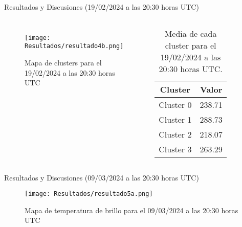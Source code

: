 \documentclass[aspectratio=169,xcolor=dvipsnames]{beamer}
\begin{document}
\begin{frame}{Resultados y Discusiones (19/02/2024 a las 20:30 horas UTC)}
    \begin{columns}

        \begin{figure}
            \centering
            \texttt{[image: Resultados/resultado4b.png]}
            {\footnotesize %
            \caption{Mapa de clusters para el 19/02/2024 a las 20:30 horas UTC}
            \label{fig15}
            }
        \end{figure}

        \centering
        \begin{table}[h!]
            \centering
            {\footnotesize %
            \begin{tabular}{|c|c|}
                \hline
                \textbf{Cluster} & \textbf{Valor} \\
                \hline
                Cluster 0 & 238.71 \\
                Cluster 1 & 288.73 \\
                Cluster 2 & 218.07 \\
                Cluster 3 & 263.29 \\                
                \hline
            \end{tabular}
            \caption{Media de cada cluster para el 19/02/2024 a las 20:30 horas UTC.}
            }
        \end{table}

    \end{columns}
\end{frame}
\begin{frame}{Resultados y Discusiones (09/03/2024 a las 20:30 horas UTC)}
\begin{figure}
    \centering
    \texttt{[image: Resultados/resultado5a.png]}
    \caption{Mapa de temperatura de brillo para el 09/03/2024 a las 20:30 horas UTC}
    \label{fig16}
\end{figure}
\end{frame}
\end{document}
